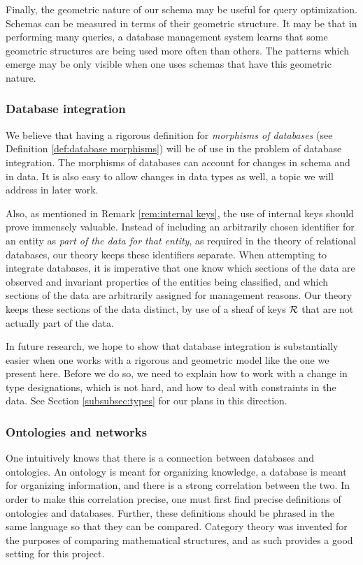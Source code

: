 \documentclass{amsart}
\begin{document}
Finally, the geometric nature of our schema may be useful for query optimization.  Schemas can be measured in terms of their geometric structure.  It may be that in performing many queries, a database management system learns that some geometric structures are being used more often than others.  The patterns which emerge may be only visible when one uses schemas that have this geometric nature.

\subsubsection{Database integration}

We believe that having a rigorous definition for {\em morphisms of databases} (see Definition \ref{def:database morphisms}) will be of use in the problem of database integration.  The morphisms of databases can account for changes in schema and in data.  It is also easy to allow changes in data types as well, a topic we will address in later work.

Also, as mentioned in Remark \ref{rem:internal keys}, the use of internal keys should prove immensely valuable.  Instead of including an arbitrarily chosen identifier for an entity as {\em part of the data for that entity}, as required in the theory of relational databases, our theory keeps these identifiers separate.  When attempting to integrate databases, it is imperative that one know which sections of the data are observed and invariant properties of the entities being classified, and which sections of the data are arbitrarily assigned for management reasons.  Our theory keeps these sections of the data distinct, by use of a sheaf of keys $\mathcal{R}$ that are not actually part of the data.

In future research, we hope to show that database integration is substantially easier when one works with a rigorous and geometric model like the one we present here.  Before we do so, we need to explain how to work with a change in type designations, which is not hard, and how to deal with constraints in the data.  See Section \ref{subsubsec:types} for our plans in this direction.

\subsubsection{Ontologies and networks}

One intuitively knows that there is a connection between databases and ontologies.  An ontology is meant for organizing knowledge, a database is meant for organizing information, and there is a strong correlation between the two.  In order to make this correlation precise, one must first find precise definitions of ontologies and databases.  Further, these definitions should be phrased in the same language so that they can be compared.  Category theory was invented for the purposes of comparing mathematical structures, and as such provides a good setting for this project.
\end{document}
